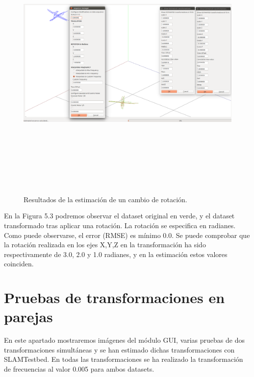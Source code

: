 \begin{figure}[H]
\label{fig:rotationTest}\includegraphics[height=14.0cm,width=18.0cm]{img/cap6/Rotation_ab_ba.png}
\hspace{0.5cm}


\caption{Resultados de la estimación de un cambio de rotación.}
\end{figure}

En la Figura 5.3 podremos observar el dataset original en verde, y el dataset transformado tras aplicar una rotación. La rotación se especifica en radianes. Como puede observarse, el error (RMSE) es mínimo 0.0. Se puede comprobar que la rotación realizada en los ejes X,Y,Z en la transformación ha sido respectivamente de 3.0, 2.0 y 1.0 radianes, y en la estimación estos valores coinciden.


\section{Pruebas de transformaciones en parejas}
En este apartado mostraremos imágenes del módulo GUI, varias pruebas de dos  transformaciones simultáneas y se han estimado dichas transformaciones con SLAMTestbed.
En todas las transformaciones se ha realizado la transformación de frecuencias al valor 0.005 para ambos datasets. 

